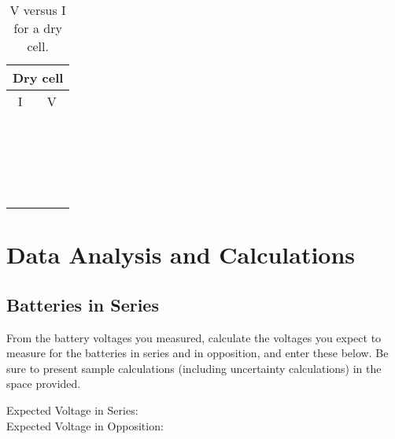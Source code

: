 \newpage
\begin{table}[htb]
\begin{center}
\begin{tabular}{|c|c|}
\hline
\multicolumn{2}{|c|}{Dry cell}\\
\hline
I & V \\
\hline
\hspace*{5cm} & \hspace*{5cm} \\
& \\
\hline
& \\
& \\
\hline
& \\
& \\
\hline
& \\
& \\
\hline
& \\
& \\
\hline
& \\
& \\
\hline
& \\
& \\
\hline
& \\
& \\
\hline
& \\
& \\
\hline
& \\
& \\
\hline
\end{tabular}
\end{center}
\caption{V versus I for a dry cell.}
\label{tab:DC:intres}
\end{table}

\newpage
\section {Data Analysis and Calculations}

\subsection{Batteries in Series}
\noindent
From the battery voltages you measured,
calculate the voltages you expect to measure for the batteries in series and in
opposition, and enter these below. Be sure to present
sample calculations (including uncertainty calculations) in the space provided.

\begin{center}
Expected Voltage in Series:\\
Expected Voltage in Opposition:
\end{center}

